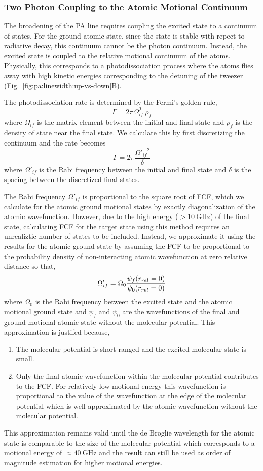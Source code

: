 \subsubsection{Two Photon Coupling to the Atomic Motional Continuum}
The broadening of the PA line requires coupling the excited state to a continuum of states.
For the ground atomic state, since the state is stable with repect to radiative decay,
this continuum cannot be the photon continuum.
Instead, the excited state is coupled to the relative motional continuum of the atoms.
Physically, this corresponds to a photodissociation process
where the atoms flies away with high kinetic energies corresponding
to the detuning of the tweezer (Fig.~\ref{fig:pa:linewidth:up-vs-down}B).

The photodissociation rate is determined by the Fermi's golden rule,
\[
  \Gamma=2\pi\Omega_{if}^2\ \rho_f
\]
where $\Omega_{if}$ is the matrix element between the initial and final state
and $\rho_f$ is the density of state near the final state.
We calculate this by first discretizing the continuum and the rate becomes
\[
  \Gamma=2\pi\frac{{\Omega'_{if}}^2}{\delta}
\]
where $\Omega'_{if}$ is the Rabi frequency between the initial and final state
and $\delta$ is the spacing between the discretized final states.

The Rabi frequency $\Omega'_{if}$ is proportional to the square root of FCF,
which we calculate for the atomic ground motional states by exactly diagonalization
of the atomic wavefunction.
However, due to the high energy ($>10~\mathrm{GHz}$) of the final state,
calculating FCF for the target state using this method requires an unrealiztic number of
states to be included.
Instead, we approximate it using the results for the atomic ground state
by assuming the FCF to be proportional to the probability density of non-interacting
atomic wavefunction at zero relative distance so that,
\[
  \Omega'_{if}=\Omega_0\frac{\psi_f{\left({r_{rel}=0}\right)}}{\psi_0{\left({r_{rel}=0}\right)}}
\]
where $\Omega_0$ is the Rabi frequency between the excited state and
the atomic motional ground state and $\psi_f$ and $\psi_0$ are the
wavefunctions of the final and ground motional atomic state without the molecular potential.
This approximation is justifed because,
\begin{enumerate}
\item The molecular potential is short ranged and the excited molecular state is small.
\item Only the final atomic wavefunction within the molecular potential contributes to the FCF.
  For relatively low motional energy
  this wavefunction is proportional to the value of the wavefunction at
  the edge of the molecular potential which is well approximated by
  the atomic wavefunction without the molecular potential.
\end{enumerate}
This approximation remains valid until the de Broglie wavelength for the atomic state
is comparable to the size of the molecular potential which corresponds to
a motional energy of $\approx40~\mathrm{GHz}$
and the result can still be used as order of magnitude estimation for higher motional energies.

